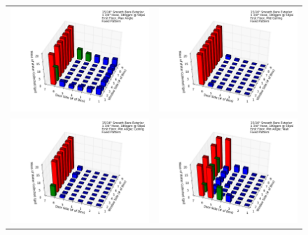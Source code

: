 \documentclass{article}
\begin{document}
\begin{figure}[ht]
\begin{tabular*}{\textwidth}{lr}
\includegraphics[width=3.2in]{../ADD_Analysis/Figures/15-12-08_101028_Datafile_15_16in_Smooth_Bore_Exterior.png} &
\includegraphics[width=3.2in]{../ADD_Analysis/Figures/15-12-08_102802_Datafile_15_16in_Smooth_Bore_Exterior.png} \\
\includegraphics[width=3.2in]{../ADD_Analysis/Figures/15-12-08_103414_Datafile_15_16in_Smooth_Bore_Exterior.png} &
\includegraphics[width=3.2in]{../ADD_Analysis/Figures/15-12-08_104150_Datafile_15_16in_Smooth_Bore_Exterior.png} \\

\end{tabular*}
\end{figure}
\end{document}
